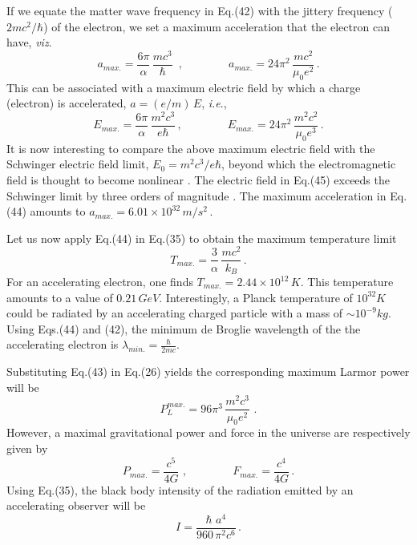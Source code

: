 \documentclass[12pt]{article}
\begin{document}
If we equate the matter wave frequency in Eq.(42) with the jittery frequency ($2mc^2/\hbar$) of the electron, we set a maximum acceleration that the electron can have, \emph{viz}.
\begin{equation}
a_{max.}=\frac{6\pi}{\alpha}\, \frac{mc^3}{\hbar}\,\,\,,\qquad\qquad a_{max.}=24\pi^2\,\frac{mc^2}{\mu_0e^2}\,.
\end{equation}
This can be associated with a maximum electric field  by which a charge (electron) is accelerated, $a=(e/m)\, E$, \emph{i.e}.,
\begin{equation}
E_{max.}=\frac{6\pi}{\alpha}\,\frac{m^2c^3}{e\hbar}\,,\qquad\qquad E_{max.}=24\pi^2\,\frac{m^2c^2}{\mu_0e^3}\,.
\end{equation}
It is now interesting to compare the above maximum electric field  with the Schwinger  electric field limit, $E_0=m^2c^3/e\hbar$,  beyond which the electromagnetic field is thought to become nonlinear {\cite{schwinger,schwinger2}}. The electric field in Eq.(45) exceeds the Schwinger limit by three orders of magnitude {\cite{schwinger1}}. The maximum acceleration in Eq.(44) amounts to $a_{max.}=6.01\times 10^{32}\, m/s^2$\,.

Let us now apply Eq.(44) in Eq.(35) to obtain the maximum temperature limit
$$T_{max.}=\frac{3}{\alpha}\, \frac{mc^2}{k_B}\,.$$
For an accelerating electron, one finds $T_{max.}=2.44\times 10^{12}\, K$. This temperature amounts to a value of $0.21\, GeV$. Interestingly, a Planck temperature of $10^{32}K$ could be radiated by an accelerating charged particle with a mass of $\sim 10^{-9}kg$. Using Eqs.(44) and (42), the minimum de Broglie wavelength of the the accelerating electron is $\lambda_{min.}=\frac{\hbar}{2mc}$.

Substituting Eq.(43) in Eq.(26) yields the corresponding maximum Larmor power will be
\begin{equation}
P^{max.}_L=96\pi^3\,\frac{m^2c^3}{\mu_0e^2}\,\,.
\end{equation}
However, a maximal gravitational power and force in the universe are respectively  given by
\begin{equation}
P_{max.}=\frac{c^5}{4G}\,\,,\qquad\qquad F_{max.}=\frac{c^4}{4G}\,.
\end{equation}
Using Eq.(35), the black body intensity of the radiation emitted by an accelerating observer will be
\begin{equation}
I=\frac{\hbar\,\,a^4}{960\,\pi^2c^6}\,.
\end{equation}
\end{document}
